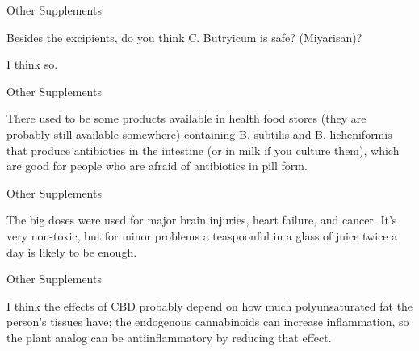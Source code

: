 \documentclass[11pt,oneside,openany,extrafontsizes]{memoir}
\begin{document}
\begin{qaexchange}{Other Supplements}

    \begin{question}
        Besides the excipients, do you think C. Butryicum is safe? (Miyarisan)?
    \end{question}

    \begin{answer}
      I think so.
    \end{answer}
\end{qaexchange}

\begin{standalonequote}{Other Supplements}

    \begin{answer}
       There used to be some products available in health food stores (they are probably still available somewhere) containing B. subtilis and B. licheniformis that produce antibiotics in the intestine (or in milk if you culture them), which are good for people who are afraid of antibiotics in pill form. 
    \end{answer}
\end{standalonequote}

\begin{standalonequote}{Other Supplements}

    \begin{answer}
      The big doses were used for major brain injuries, heart failure, and cancer. It's very non-toxic, but for minor problems a teaspoonful in a glass of juice twice a day is likely to be enough.
    \end{answer}
\end{standalonequote}

\begin{standalonequote}{Other Supplements}

    \begin{answer}
      I think the effects of CBD probably depend on how much polyunsaturated fat the person's tissues have; the endogenous cannabinoids can increase inflammation, so the plant analog can be antiinflammatory by reducing that effect.
    \end{answer}
\end{standalonequote}
\end{document}

